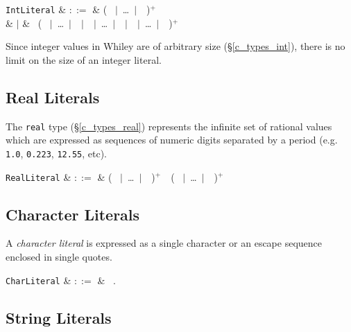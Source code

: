\begin{syntax}
  \verb+IntLiteral+ & $::=$ & \big( \ $|$\ \ldots\ $|$\ \ \big)$^+$ \\
  & $|$ &  \ \big( \ $|$\ \ldots\ $|$\ \ $|$\ \ $|$\ \ldots\ $|$\ \ $|$\ \ $|$\ \ldots\ $|$\ \ \big)$^+$\\
\end{syntax}

Since integer values in Whiley are of arbitrary size (\S\ref{c_types_int}), there is no limit on the size of an integer literal.

\subsection{Real Literals}

The \lstinline{real} type (\S\ref{c_types_real}) represents the infinite set of rational values which are expressed as sequences of numeric digits separated by a period (e.g. \lstinline{1.0}, \lstinline{0.223}, \lstinline{12.55}, etc).

\begin{syntax}
  \verb+RealLiteral+ & $::=$ & \big( \ $|$\ \ldots\ $|$\ \ \big)$^+$\ \ \big( \ $|$\ \ldots\ $|$\ \ \big)$^+$ \\
\end{syntax}

\subsection{Character Literals}

A {\em character literal} is expressed as a single character or an escape sequence enclosed in single quotes.

\begin{syntax}
  \verb+CharLiteral+ & $::=$ & \ .\  \\
\end{syntax}

\subsection{String Literals}
